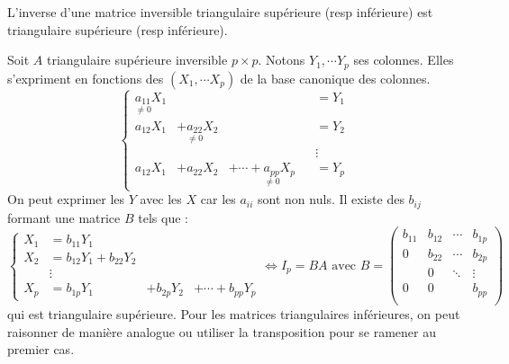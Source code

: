 \begin{propn}
  L'inverse d'une matrice inversible triangulaire supérieure (resp inférieure) est triangulaire supérieure (resp inférieure).
\end{propn}
\begin{demo}
  Soit $A$ triangulaire supérieure inversible $p\times p$. Notons $Y_1, \cdots Y_p$ ses colonnes. Elles s'expriment en fonctions des $(X_1, \cdots X_p)$ de la base canonique des colonnes.
\[
  \left\lbrace
  \begin{aligned}
    \underset{\neq 0}{a_{1 1}} X_1&              &                     & &= Y_1 \\
    a_{1 2} X_1& + \underset{\neq 0 }{a_{2 2}}X_2&                     & &= Y_2 \\
               &             &                                         & &\vdots \\
    a_{1 2} X_1& + a_{2 2}X_2& + \cdots + \underset{\neq 0}{a_{p p}}X_p& &= Y_p
  \end{aligned}
  \right.
\]
On peut exprimer les $Y$ avec les $X$ car les $a_{i i}$ sont non nuls. Il existe des $b_{i j}$ formant une matrice $B$ tels que :
\[
  \left\lbrace
  \begin{aligned}
    X_1 &= b_{1 1} Y_1\\
    X_2 &= b_{1 2} Y_1 + b_{2 2}Y_2 \\
        &\vdots \\
    X_p &= b_{1 p} Y_1& + b_{2 p}Y_2& + \cdots + b_{p p}Y_p
  \end{aligned}
  \right.
  \Leftrightarrow
  I_p = B A
  \text{ avec }
  B =
  \begin{pmatrix}
    b_{1 1} & b_{1 2} & \cdots &b_{1 p} \\
    0       & b_{2 2} & \cdots &b_{2 p} \\
            &  0      & \ddots & \vdots \\
    0       & 0       &        &b_{p p} \\
  \end{pmatrix}
\]
qui est triangulaire supérieure. Pour les matrices triangulaires inférieures, on peut raisonner de manière analogue ou utiliser la transposition pour se ramener au premier cas.
\end{demo}


